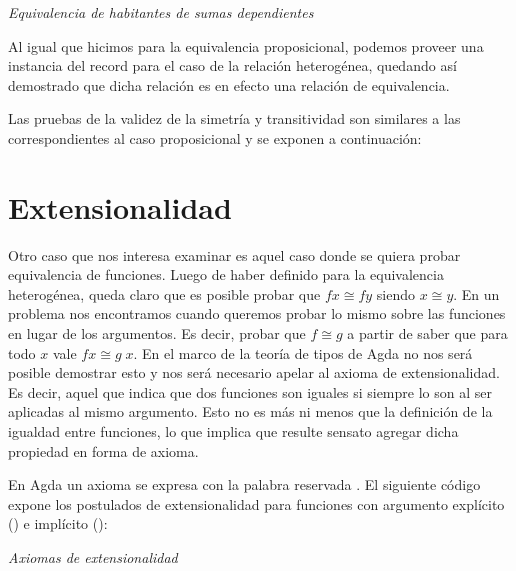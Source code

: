 \begin{agdacode}{\it Equivalencia de habitantes de sumas dependientes}\label{code:dSumEq}

\end{agdacode}

\vspace{2ex}

Al igual que hicimos para la equivalencia proposicional, podemos proveer una instancia del record  para el caso de la relación heterogénea, quedando así demostrado que dicha relación es en efecto una relación de equivalencia.


Las pruebas de la validez de la simetría y transitividad son similares a las correspondientes al caso proposicional y se exponen a continuación:



\section{Extensionalidad}

Otro caso que nos interesa examinar es aquel caso donde se quiera probar equivalencia de funciones.
Luego de haber definido  para la equivalencia heterogénea, queda claro que es posible probar que $f x \cong f y$ siendo $x\cong y$. En un problema nos encontramos cuando queremos probar lo mismo sobre las funciones en lugar de los argumentos. Es decir, probar que $f \cong g$ a partir de saber que para todo $x$ vale $f x \cong g\; x$.
En el marco de la teoría de tipos de Agda no nos será posible demostrar esto y nos será necesario apelar al axioma de extensionalidad. Es decir, aquel que indica que dos funciones son iguales si siempre lo son al ser aplicadas al mismo argumento. Esto no es más ni menos que la definición de la igualdad entre funciones, lo que implica que resulte sensato agregar dicha propiedad en forma de axioma.

En Agda un axioma se expresa con la palabra reservada .
El siguiente código expone los postulados de extensionalidad para funciones con argumento explícito () e implícito ():
\begin{agdacode}\label{code:ext}{\it Axiomas de extensionalidad}

  
\end{agdacode}

